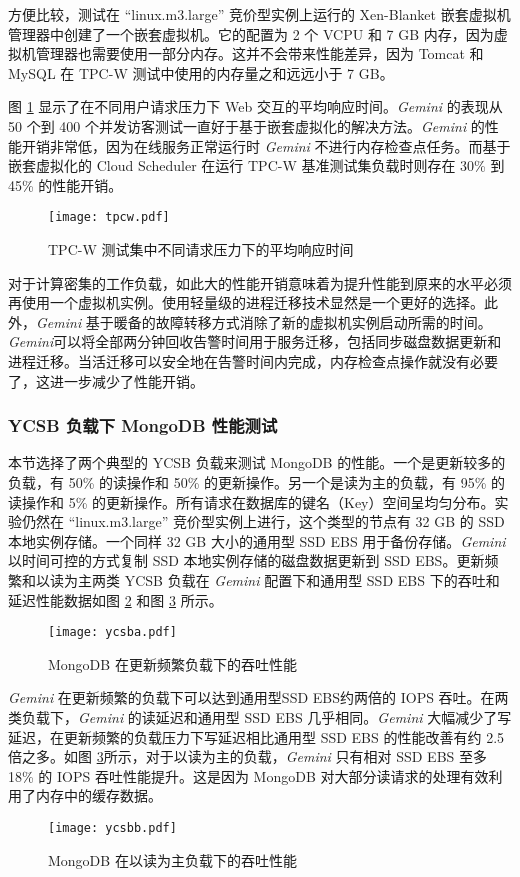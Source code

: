 方便比较，测试在 ``linux.m3.large'' 竞价型实例上运行的 Xen-Blanket \cite{Williams:2012:XVO:2168836.2168849} 嵌套虚拟机管理器中创建了一个嵌套虚拟机。它的配置为 2 个 VCPU 和 7 GB 内存，因为虚拟机管理器也需要使用一部分内存。这并不会带来性能差异，因为 Tomcat 和 MySQL 在 TPC-W 测试中使用的内存量之和远远小于 7 GB。

图 \ref{figure:tpcw} 显示了在不同用户请求压力下 Web 交互的平均响应时间。\emph{Gemini} 的表现从 50 个到 400 个并发访客测试一直好于基于嵌套虚拟化的解决方法。\emph{Gemini} 的性能开销非常低，因为在线服务正常运行时 \emph{Gemini} 不进行内存检查点任务。而基于嵌套虚拟化的 Cloud Scheduler 在运行 TPC-W 基准测试集负载时则存在 30\% 到 45\% 的性能开销。
\begin{figure}[]
  \centering
  \texttt{[image: tpcw.pdf]}
  \caption{TPC-W 测试集中不同请求压力下的平均响应时间}
  \label{figure:tpcw}
\end{figure}

对于计算密集的工作负载，如此大的性能开销意味着为提升性能到原来的水平必须再使用一个虚拟机实例。使用轻量级的进程迁移技术显然是一个更好的选择。此外，\emph{Gemini} 基于暖备的故障转移方式消除了新的虚拟机实例启动所需的时间。\emph{Gemini}可以将全部两分钟回收告警时间用于服务迁移，包括同步磁盘数据更新和进程迁移。当活迁移可以安全地在告警时间内完成，内存检查点操作就没有必要了，这进一步减少了性能开销。

\subsubsection{YCSB 负载下 MongoDB 性能测试}
本节选择了两个典型的 YCSB 负载来测试 MongoDB 的性能。一个是更新较多的负载，有 50\% 的读操作和 50\% 的更新操作。另一个是读为主的负载，有 95\% 的读操作和 5\% 的更新操作。所有请求在数据库的键名（Key）空间呈均匀分布。实验仍然在 ``linux.m3.large'' 竞价型实例上进行，这个类型的节点有 32 GB 的 SSD 本地实例存储。一个同样 32 GB 大小的通用型 SSD EBS 用于备份存储。\emph{Gemini} 以时间可控的方式复制 SSD 本地实例存储的磁盘数据更新到 SSD EBS。更新频繁和以读为主两类 YCSB 负载在 \emph{Gemini} 配置下和通用型 SSD EBS 下的吞吐和延迟性能数据如图 \ref{figure:ycsba} 和图 \ref{figure:ycsbb} 所示。
\begin{figure}[]
  \centering
  \texttt{[image: ycsba.pdf]}
  \caption{MongoDB 在更新频繁负载下的吞吐性能}
  \label{figure:ycsba}
\end{figure}

\emph{Gemini} 在更新频繁的负载下可以达到通用型SSD EBS约两倍的 IOPS 吞吐。在两类负载下，\emph{Gemini} 的读延迟和通用型 SSD EBS 几乎相同。\emph{Gemini} 大幅减少了写延迟，在更新频繁的负载压力下写延迟相比通用型 SSD EBS 的性能改善有约 2.5 倍之多。如图 \ref{figure:ycsbb}所示，对于以读为主的负载，\emph{Gemini} 只有相对 SSD EBS 至多 18\% 的 IOPS 吞吐性能提升。这是因为 MongoDB 对大部分读请求的处理有效利用了内存中的缓存数据。
\begin{figure}[]
  \centering
  \texttt{[image: ycsbb.pdf]}
  \caption{MongoDB 在以读为主负载下的吞吐性能}
  \label{figure:ycsbb}
\end{figure}

